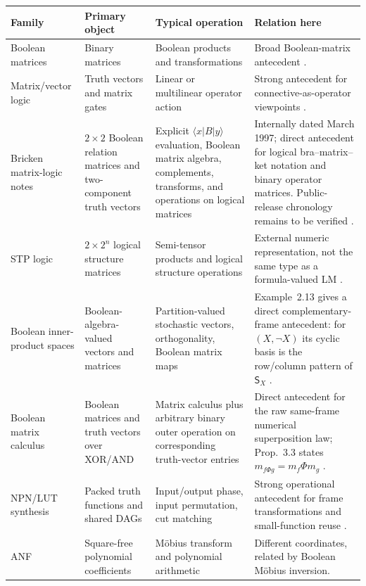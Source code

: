 \documentclass[11pt]{article}
\theoremstyle{definition}
\theoremstyle{remark}
\begin{document}
\begin{table}[ht]
\centering\footnotesize
\begin{tabular}{L{.15\linewidth}L{.20\linewidth}L{.22\linewidth}L{.31\linewidth}}
\toprule
Family & Primary object & Typical operation & Relation here\\
\midrule
Boolean matrices & Binary matrices & Boolean products and transformations & Broad Boolean-matrix antecedent \cite{Edwards1972}.\\
Matrix/vector logic & Truth vectors and matrix gates & Linear or multilinear operator action & Strong antecedent for connective-as-operator viewpoints \cite{Stern1988,Mizraji1992,Mizraji2008}.\\
Bricken matrix-logic notes & $2\times2$ Boolean relation matrices and two-component truth vectors & Explicit $\langle x|B|y\rangle$ evaluation, Boolean matrix algebra, complements, transforms, and operations on logical matrices & Internally dated March 1997; direct antecedent for logical bra--matrix--ket notation and binary operator matrices.  Public-release chronology remains to be verified \cite{Bricken1997}.\\
STP logic & $2\times2^n$ logical structure matrices & Semi-tensor products and logical structure operations & External numeric representation, not the same type as a formula-valued LM \cite{ChengQi2010,ChengQiLi2011}.\\
Boolean inner-product spaces & Boolean-algebra-valued vectors and matrices & Partition-valued stochastic vectors, orthogonality, Boolean matrix maps & Example~2.13 gives a direct complementary-frame antecedent: for $(X,\neg X)$ its cyclic basis is the row/column pattern of $\mathsf S_X$ \cite{Gudder2009}.\\
Boolean matrix calculus & Boolean matrices and truth vectors over XOR/AND & Matrix calculus plus arbitrary binary outer operation on corresponding truth-vector entries & Direct antecedent for the raw same-frame numerical superposition law; Prop.~3.3 states $m_{f\Phi g}=m_f\Phi m_g$ \cite{Cheng2011}.\\
NPN/LUT synthesis & Packed truth functions and shared DAGs & Input/output phase, input permutation, cut matching & Strong operational antecedent for frame transformations and small-function reuse \cite{Mishchenko2006,Zhou2019}.\\
ANF & Square-free polynomial coefficients & M\"obius transform and polynomial arithmetic & Different coordinates, related by Boolean M\"obius inversion.\\

\end{tabular}
\end{table}
\end{document}
